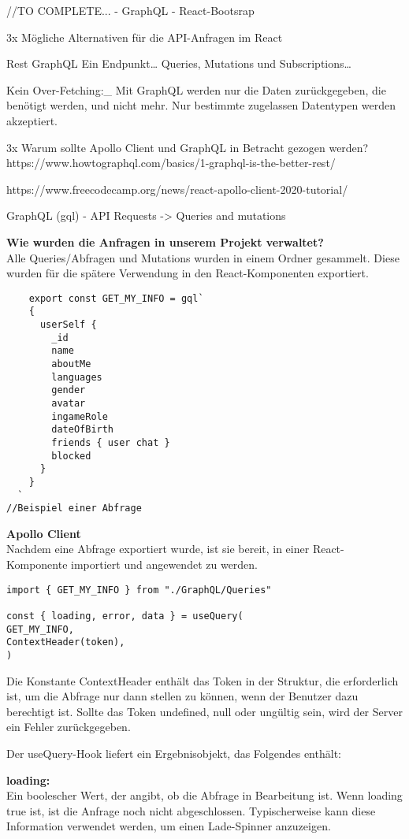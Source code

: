 


//TO COMPLETE...
- GraphQL
- React-Bootsrap

3x Mögliche Alternativen für die API-Anfragen im React

Rest
GraphQL
Ein Endpunkt…
Queries, Mutations und Subscriptions…

Kein Over-Fetching:_
Mit GraphQL werden nur die Daten zurückgegeben, die benötigt werden, und nicht mehr.
Nur bestimmte zugelassen Datentypen werden akzeptiert.

3x Warum sollte Apollo Client und GraphQL in Betracht gezogen werden?
https://www.howtographql.com/basics/1-graphql-is-the-better-rest/

https://www.freecodecamp.org/news/react-apollo-client-2020-tutorial/

GraphQL (gql)
- API Requests -> Queries and mutations

\textbf{Wie wurden die Anfragen in unserem Projekt verwaltet?}\\
Alle Queries/Abfragen und Mutations wurden in einem Ordner gesammelt. 
Diese wurden für die spätere Verwendung in den React-Komponenten exportiert.

\begin{lstlisting}
    export const GET_MY_INFO = gql`
    {
      userSelf {
        _id
        name
        aboutMe
        languages
        gender
        avatar
        ingameRole
        dateOfBirth
        friends { user chat }        
        blocked
      }
    }
  `
//Beispiel einer Abfrage
\end{lstlisting}


\newpage
\textbf{Apollo Client}\\
Nachdem eine Abfrage exportiert wurde, ist sie bereit, in einer React-Komponente importiert und angewendet zu werden.

\begin{lstlisting}
import { GET_MY_INFO } from "./GraphQL/Queries"

const { loading, error, data } = useQuery(
GET_MY_INFO,
ContextHeader(token),
)
\end{lstlisting}
Die Konstante ContextHeader enthält das Token in der Struktur, die erforderlich ist, um die Abfrage nur dann stellen zu können, wenn der Benutzer dazu berechtigt ist.
Sollte das Token undefined, null oder ungültig sein, wird der Server ein Fehler zurückgegeben.

Der useQuery-Hook liefert ein Ergebnisobjekt, das Folgendes enthält:

\textbf{loading:}\\
Ein boolescher Wert, der angibt, ob die Abfrage in Bearbeitung ist.
Wenn loading true ist, ist die Anfrage noch nicht abgeschlossen. Typischerweise kann diese Information verwendet werden, um einen Lade-Spinner anzuzeigen.
\\


